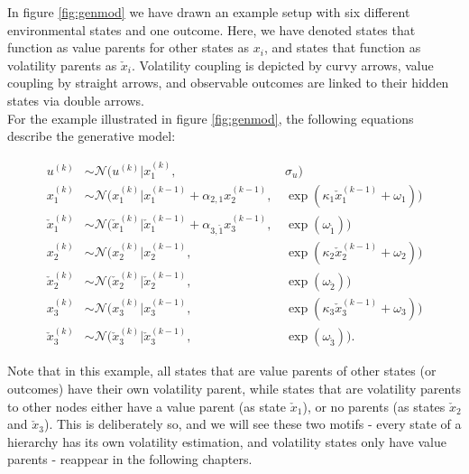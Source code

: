 In figure \ref{fig:genmod} we have drawn an example setup with six different environmental states and one outcome. Here, we have denoted states that function as value parents for other states as $x_i$, and states that function as volatility parents as $\check{x}_i$. Volatility coupling is depicted by curvy arrows, value coupling by straight arrows, and observable outcomes are linked to their hidden states via double arrows. \\

For the example illustrated in figure \ref{fig:genmod}, the following equations describe the generative model:

\begin{align}
    u^{(k)}             &\sim \mathcal{N}(u^{(k)} | x_1^{(k)}, \, &\sigma_u)\\
    x_1^{(k)}           &\sim \mathcal{N}(x_1^{(k)} | x_1^{(k-1)} + \alpha_{2,1} x_2^{(k-1)}, \, &\exp(\kappa_1 \check{x}_1^{(k-1)} + \omega_1))\\
    \check{x}_1^{(k)}   &\sim \mathcal{N}(\check{x}_1^{(k)} | \check{x}_1^{(k-1)} + \alpha_{3,\check{1}} x_3^{(k-1)}, \, &\exp(\omega_{\check{1}}))\\
    x_2^{(k)}           &\sim \mathcal{N}(x_2^{(k)} | x_2^{(k-1)}, \, &\exp(\kappa_2 \check{x}_2^{(k-1)} + \omega_2))\\
    \check{x}_2^{(k)}   &\sim \mathcal{N}(\check{x}_2^{(k)} | \check{x}_2^{(k-1)}, \, &\exp(\omega_{\check{2}}))\\
    x_3^{(k)}           &\sim \mathcal{N}(x_3^{(k)} | x_3^{(k-1)}, \, &\exp(\kappa_3 \check{x}_3^{(k-1)} + \omega_3))\\
    \check{x}_3^{(k)}   &\sim \mathcal{N}(\check{x}_3^{(k)} | \check{x}_3^{(k-1)}, \, &\exp(\omega_{\check{3}})).
\end{align}

Note that in this example, all states that are value parents of other states (or outcomes) have their own volatility parent, while states that are volatility parents to other nodes either have a value parent (as state $\check{x}_1$), or no parents (as states $\check{x}_2$ and $\check{x}_3$). This is deliberately so, and we will see these two motifs - every state of a hierarchy has its own volatility estimation, and volatility states only have value parents - reappear in the following chapters.